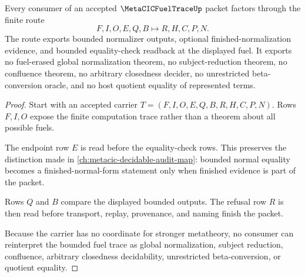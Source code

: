 \begin{theorem}
\label{thm:metacic-fuel-trace-bounded-conversion-nonescape}
Every consumer of an accepted $\MetaCICFuelTraceUp$ packet factors through the finite route
$$
F,I,O,E,Q,B \longmapsto R,H,C,P,N .
$$
The route exports bounded normalizer outputs, optional finished-normalization evidence, and bounded equality-check readback at the displayed fuel. It exports no fuel-erased global normalization theorem, no subject-reduction theorem, no confluence theorem, no arbitrary closedness decider, no unrestricted beta-conversion oracle, and no host quotient equality of represented terms.
\end{theorem}
\begin{proof}
Start with an accepted carrier $T=(F,I,O,E,Q,B,R,H,C,P,N)$. Rows $F,I,O$ expose the finite computation trace rather than a theorem about all possible fuels.

The endpoint row $E$ is read before the equality-check rows. This preserves the distinction made in \autoref{ch:metacic-decidable-audit-map}: bounded normal equality becomes a finished-normal-form statement only when finished evidence is part of the packet.

Rows $Q$ and $B$ compare the displayed bounded outputs. The refusal row $R$ is then read before transport, replay, provenance, and naming finish the packet.

Because the carrier has no coordinate for stronger metatheory, no consumer can reinterpret the bounded fuel trace as global normalization, subject reduction, confluence, arbitrary closedness decidability, unrestricted beta-conversion, or quotient equality.
\end{proof}

